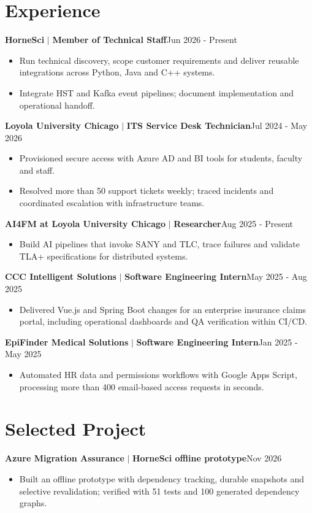 \documentclass[letterpaper,10pt]{article}
\newcommand{\role}[3]{\vspace{3pt}\textbf{#1} $|$ \textbf{#2}\hfill{\fontsize{9}{10}\selectfont #3}\par\nopagebreak}
\begin{document}
\section*{Experience}
\role{HorneSci}{Member of Technical Staff}{Jun 2026 - Present}
\begin{itemize}
\item Run technical discovery, scope customer requirements and deliver reusable integrations across Python, Java and C++ systems.
\item Integrate HST and Kafka event pipelines; document implementation and operational handoff.
\end{itemize}
\role{Loyola University Chicago}{ITS Service Desk Technician}{Jul 2024 - May 2026}
\begin{itemize}
\item Provisioned secure access with Azure AD and BI tools for students, faculty and staff.
\item Resolved more than 50 support tickets weekly; traced incidents and coordinated escalation with infrastructure teams.
\end{itemize}
\role{AI4FM at Loyola University Chicago}{Researcher}{Aug 2025 - Present}
\begin{itemize}
\item Build AI pipelines that invoke SANY and TLC, trace failures and validate TLA+ specifications for distributed systems.
\end{itemize}
\role{CCC Intelligent Solutions}{Software Engineering Intern}{May 2025 - Aug 2025}
\begin{itemize}
\item Delivered Vue.js and Spring Boot changes for an enterprise insurance claims portal, including operational dashboards and QA verification within CI/CD.
\end{itemize}
\role{EpiFinder Medical Solutions}{Software Engineering Intern}{Jan 2025 - May 2025}
\begin{itemize}
\item Automated HR data and permissions workflows with Google Apps Script, processing more than 400 email-based access requests in seconds.
\end{itemize}
\section*{Selected Project}
\role{Azure Migration Assurance}{HorneSci offline prototype}{Nov 2026}
\begin{itemize}
\item Built an offline prototype with dependency tracking, durable snapshots and selective revalidation; verified with 51 tests and 100 generated dependency graphs.
\end{itemize}
\end{document}

